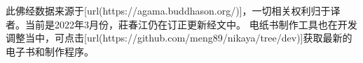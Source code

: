 此佛经数据来源于[url(https://agama.buddhason.org/)]，一切相关权利归于译者。当前是2022年3月份，莊春江仍在订正更新经文中。
\blank
电纸书制作工具也在开发调整当中，可点击[url(https://github.com/meng89/nikaya/tree/dev)]获取最新的电子书和制作程序。